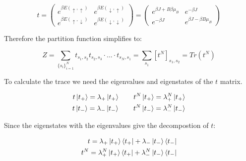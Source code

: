 \documentclass[12pt]{article}
\theoremstyle{plain}
\begin{document}
\begin{equation}
    t = 
    \left( \begin{array}{cc}
        e^{\beta E(\uparrow, \uparrow)} & e^{\beta E(\downarrow, \uparrow)} \\
        e^{\beta E(\uparrow, \downarrow)} & e^{\beta E(\downarrow, \downarrow)}
    \end{array}
    \right) = 
    \left( \begin{array}{cc}
        e^{\beta J + B\beta \mu_{B}} & e^{-\beta J} \\
        e^{-\beta J} & e^{\beta J - \beta B \mu_{B}}
    \end{array}
    \right)
    \label{t}
\end{equation}

\vspace{2mm}

\par Therefore the partition function simplifies to:

\vspace{2mm}

\begin{equation*}
    Z = \sum_{\{s_{i}\}_{i=1}^{N}} t_{s_1, s_2}t_{s_2, s_3} \cdot ... \cdot t_{s_N, s_1} = \sum_{s_1} [t^{N}]_{s_1, s_2} = Tr(t^{N})
\end{equation*}

\vspace{2mm}

\par To calculate the trace we need the eigenvalues and eigenstates of the $t$ matrix.

\vspace{2mm}

\begin{align*}
    t \ket{t_+} = \lambda_+ \ket{t_+} \quad \quad t^N \ket{t_+} = \lambda_+^N \ket{t_+} \\
    t \ket{t_-} = \lambda_- \ket{t_-} \quad \quad t^N \ket{t_-} = \lambda_-^N \ket{t_-}
\end{align*}

\vspace{2mm}

\par Since the eigenstates with the eigenvalues give the decompostion of $t$:

\vspace{2mm}

\begin{align*}
    t = \lambda_+ \ket{t_+} \bra{t_+} + \lambda_- \ket{t_-} \bra{t_-} \\
    t^N = \lambda_+^N \ket{t_+} \bra{t_+} + \lambda_-^N \ket{t_-} \bra{t_-}
\end{align*}
\end{document}
